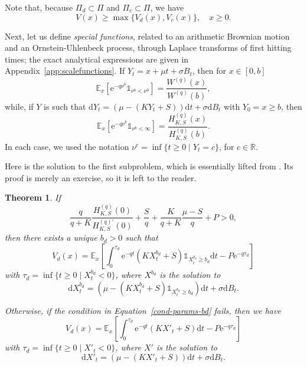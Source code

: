 \documentclass[11pt,reqno]{amsart}
\newtheorem{theorem}{Theorem}[section]
\newcommand{\E}{\mathbb{E}}
\newcommand{\e}{\mathrm{e}}
\newcommand{\reals}{\mathbb{R}}
\newcommand{\ind}{\mathds{1}}
\newcommand{\Wq}{W^{(q)}}
\newcommand{\Hq}{H^{(q)}_{K,S}}
\newcommand{\Hqprime}{H^{(q) \prime}_{K,S}}
\newcommand{\diff}{\mathrm{d}}
\newcommand{\ettaz}{\frac{S}{q} + \frac{K}{q+K}\frac{\mu - S}{q}}
\renewcommand{\geq}{\geqslant}
\begin{document}
Note that, because $\Pi_d \subset \Pi$ and $\Pi_c \subset \Pi$, we have
\begin{equation}
    V(x) \geq \max\{V_d(x), V_c(x)\},\quad x\geq 0.
\end{equation}

Next, let us define \textit{special functions}, related to an arithmetic Brownian motion and an Ornstein-Uhlenbeck process, through Laplace transforms of first hitting times; the exact analytical expressions are given in Appendix~\ref{app:scalefunctions}. If $Y_t = x + \mu t + \sigma B_t$, then for $x\in [0,b]$
\begin{equation}
\E_x\left[\e^{-q\nu^b}\ind_{\nu^b < \nu^0}  \right] = \frac{\Wq(x)}{\Wq(b)} ,
\end{equation}
while, if $Y$ is such that $\diff Y_t = (\mu - (KY_t + S)) \diff t + \sigma \diff B_t$ with $Y_0 = x \geq b$, then
\begin{equation}
\E_x\left[\e^{-q\nu^b}\ind_{\nu^b<\infty} \right] = \frac{\Hq(x)}{\Hq(b)} .
\end{equation}
In each case, we used the notation $\nu^c = \inf\{t\geq 0 \mid Y_t = c\}$, for $c \in \reals$.

Here is the solution to the first subproblem, which is essentially lifted from \cite{renaud-simard_2021, rao_2023, fendri_2025}. Its proof is merely an exercise, so it is left to the reader.

\begin{theorem}\label{thm:sol-Jd}
    If
    \begin{equation}\label{cond-params-bd}
        \frac{q}{q+K}\frac{\Hq(0)}{\Hqprime(0)} + \ettaz + P > 0,
    \end{equation}
    then there exists a unique $b_d>0$ such that
    \begin{equation}\label{Vd-proba}
        V_d(x) = \E_x \left[ \int_0^{\tau_d} \mathrm{e}^{-qt} (KX^{b_d}_t +S) \ind_{X^{b_d}_t \geq b_d} \diff t - P\e^{-q\tau_d}\right]        
    \end{equation}
    with $\tau_d = \inf\{t\geq 0\mid X^{b_d}_t < 0\}$, where $X^{b_d}$ is the solution to
    \begin{equation}
        \diff X^{b_d}_t = \left(\mu - (K X^{b_d}_t + S) \ind_{X^{b_d}_t \geq b_d} \right) \diff t + \sigma \diff B_t .
    \end{equation}
    
    Otherwise, if the condition in Equation~\eqref{cond-params-bd} fails, then we have
    \begin{equation}\label{Vd-bd0-proba}
        V_d(x) = \E_x \left[ \int_0^{\tau_d} \mathrm{e}^{-qt} (KX'_t +S) \diff t - P\e^{-q\tau_d}\right]
    \end{equation}
    with $\tau_d = \inf\{t\geq 0\mid X'_t < 0\}$, where $X'$ is the solution to
    \begin{equation}
        \diff X'_t = \left(\mu - (K X'_t + S) \right) \diff t + \sigma \diff B_t .
    \end{equation}
\end{theorem}
\end{document}
